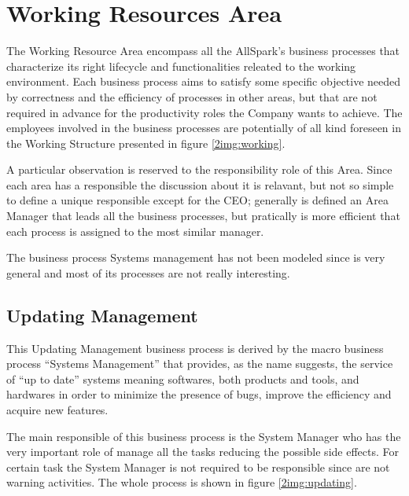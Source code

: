 \section{Working Resources Area}
The Working Resource Area encompass all the AllSpark's business processes that characterize its right lifecycle and functionalities releated to the working environment. Each business process aims to satisfy some specific objective needed by correctness and the efficiency of processes in other areas, but that are not required in advance for the productivity roles the Company wants to achieve. The employees involved in the business processes are potentially of all kind foreseen in the Working Structure presented in figure \ref{2img:working}.

A particular observation is reserved to the responsibility role of this Area. Since each area has a responsible the discussion about it is relavant, but not so simple to define a unique responsible except for the CEO; generally is defined an Area Manager that leads all the business processes, but pratically is more efficient that each process is assigned to the most similar manager.

The business process Systems management has not been modeled since is very general and most of its processes are not really interesting.

\subsection{Updating Management}
This Updating Management business process is derived by the macro business process ``Systems Management'' that provides, as the name suggests, the service of ``up to date'' systems meaning softwares, both products and tools, and hardwares in order to minimize the presence of bugs, improve the efficiency and acquire new features.

The main responsible of this business process is the System Manager who has the very important role of manage all the tasks reducing the possible side effects. For certain task the System Manager is not required to be responsible since are not warning activities. The whole process is shown in figure \ref{2img:updating}.

